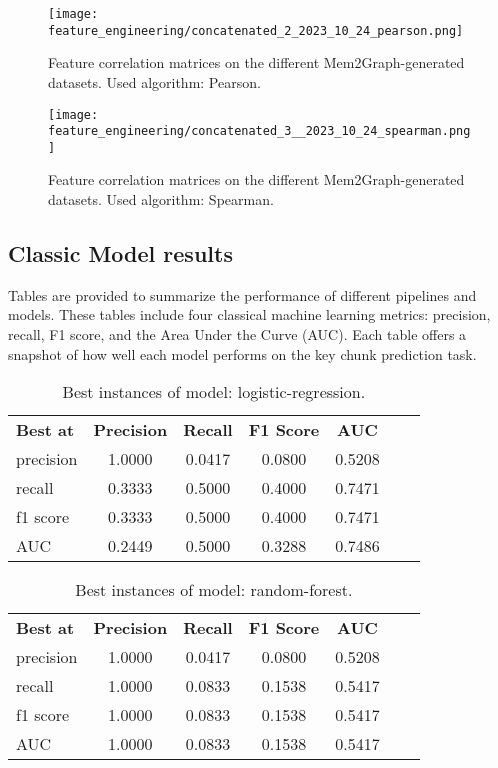 \begin{figure}[H]\label{results:corr_matrices:pearson}
    \centering
    \texttt{[image: feature\_engineering/concatenated\_2\_2023\_10\_24\_pearson.png]}
    \caption{Feature correlation matrices on the different Mem2Graph-generated datasets. Used algorithm: Pearson.}
\end{figure}

\begin{figure}[H]\label{results:corr_matrices:spearman}
    \centering
    \texttt{[image: feature\_engineering/concatenated\_3\_\_2023\_10\_24\_spearman.png]}
    \caption{Feature correlation matrices on the different Mem2Graph-generated datasets. Used algorithm: Spearman.}
\end{figure}

\subsection{Classic Model results}

Tables are provided to summarize the performance of different pipelines and models. These tables include four classical machine learning metrics: precision, recall, F1 score, and the Area Under the Curve (AUC). Each table offers a snapshot of how well each model performs on the key chunk prediction task.

\begin{table}[H]
    \centering
    \caption{Best instances of model: logistic-regression.}
    \begin{tabular}{lcccccc}
      \textbf{Best at}  & \textbf{Precision} & \textbf{Recall} & \textbf{F1 Score} & \textbf{AUC} \\
        precision & 1.0000 & 0.0417 & 0.0800 & 0.5208 \\
        recall & 0.3333 & 0.5000 & 0.4000 & 0.7471 \\
        f1 score & 0.3333 & 0.5000 & 0.4000 & 0.7471 \\
        AUC & 0.2449 & 0.5000 & 0.3288 & 0.7486 \\
    \end{tabular}
\end{table}


\begin{table}[H]
    \centering
    \caption{Best instances of model: random-forest.}
    \begin{tabular}{lcccccc}
      \textbf{Best at}  & \textbf{Precision} & \textbf{Recall} & \textbf{F1 Score} & \textbf{AUC} \\
        precision & 1.0000 & 0.0417 & 0.0800 & 0.5208 \\
        recall & 1.0000 & 0.0833 & 0.1538 & 0.5417 \\
        f1 score & 1.0000 & 0.0833 & 0.1538 & 0.5417 \\
        AUC & 1.0000 & 0.0833 & 0.1538 & 0.5417 \\
    \end{tabular}
\end{table}


